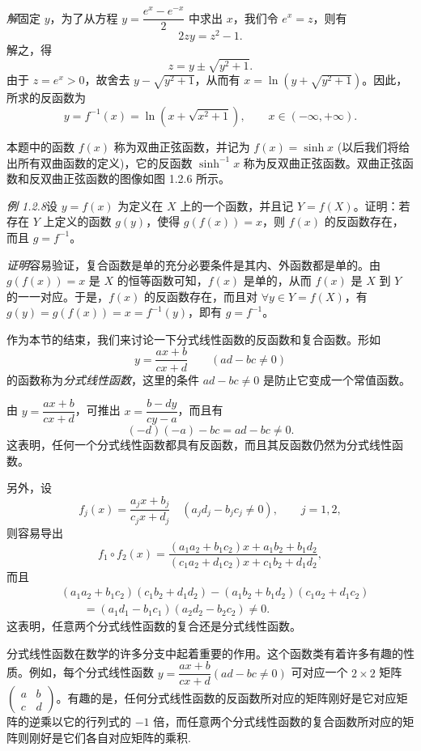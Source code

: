 \documentclass[UTF8,12pt,a4paper,fontset=fandol]{ctexbook}
\begin{document}
\noindent\emph{解}\quad 固定 $y$，为了从方程 $y=\dfrac{e^x-e^{-x}}{2}$ 中求出 $x$，我们令 $e^x=z$，则有
\[
  2zy=z^2-1.
\]
解之，得
\[
  z=y\pm\sqrt{y^2+1}.
\]
由于 $z=e^x>0$，故舍去 $y-\sqrt{y^2+1}$，从而有 $x=\ln(y+\sqrt{y^2+1})$。因此，所求的反函数为
\[
  y=f^{-1}(x)=\ln(x+\sqrt{x^2+1}),\qquad x\in(-\infty,+\infty).
\]

本题中的函数 $f(x)$ 称为双曲正弦函数，并记为 $f(x)=\sinh x$ (以后我们将给出所有双曲函数的定义)，它的反函数 $\sinh^{-1}x$ 称为反双曲正弦函数。双曲正弦函数和反双曲正弦函数的图像如图 1.2.6 所示。

\noindent\emph{例 1.2.8}\quad 设 $y=f(x)$ 为定义在 $X$ 上的一个函数，并且记 $Y=f(X)$。证明：若存在 $Y$ 上定义的函数 $g(y)$，使得 $g(f(x))=x$，则 $f(x)$ 的反函数存在，而且 $g=f^{-1}$。

\noindent\emph{证明}\quad 容易验证，复合函数是单的充分必要条件是其内、外函数都是单的。由 $g(f(x))=x$ 是 $X$ 的恒等函数可知，$f(x)$ 是单的，从而 $f(x)$ 是 $X$ 到 $Y$ 的一一对应。于是，$f(x)$ 的反函数存在，而且对 $\forall y\in Y=f(X)$，有 $g(y)=g(f(x))=x=f^{-1}(y)$，即有 $g=f^{-1}$。

作为本节的结束，我们来讨论一下分式线性函数的反函数和复合函数。形如
\[
  y=\frac{ax+b}{cx+d}\qquad (ad-bc\ne0)
\]
的函数称为\emph{分式线性函数}，这里的条件 $ad-bc\ne0$ 是防止它变成一个常值函数。

由 $y=\dfrac{ax+b}{cx+d}$，可推出 $x=\dfrac{b-dy}{cy-a}$，而且有
\[
  (-d)(-a)-bc=ad-bc\ne0.
\]
这表明，任何一个分式线性函数都具有反函数，而且其反函数仍然为分式线性函数。

另外，设
\[
  f_j(x)=\frac{a_jx+b_j}{c_jx+d_j}\quad (a_jd_j-b_jc_j\ne0),\qquad j=1,2,
\]
则容易导出
\[
  f_1\circ f_2(x)=
  \frac{(a_1a_2+b_1c_2)x+a_1b_2+b_1d_2}
  {(c_1a_2+d_1c_2)x+c_1b_2+d_1d_2},
\]
而且
\[
\begin{aligned}
 &(a_1a_2+b_1c_2)(c_1b_2+d_1d_2)
 -(a_1b_2+b_1d_2)(c_1a_2+d_1c_2)\\
 &\qquad=(a_1d_1-b_1c_1)(a_2d_2-b_2c_2)\ne0.
\end{aligned}
\]
这表明，任意两个分式线性函数的复合还是分式线性函数。

分式线性函数在数学的许多分支中起着重要的作用。这个函数类有着许多有趣的性质。例如，每个分式线性函数 $y=\dfrac{ax+b}{cx+d}(ad-bc\ne0)$ 可对应一个 $2\times2$ 矩阵 $\begin{pmatrix}a&b\\ c&d\end{pmatrix}$。有趣的是，任何分式线性函数的反函数所对应的矩阵刚好是它对应矩阵的逆乘以它的行列式的 $-1$ 倍，而任意两个分式线性函数的复合函数所对应的矩阵则刚好是它们各自对应矩阵的乘积.
\end{document}
